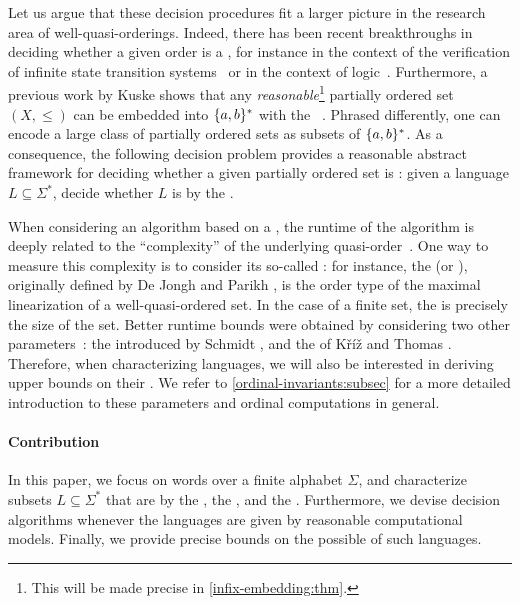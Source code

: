 \AP Let us argue that these decision procedures fit a larger picture in the
research area of well-quasi-orderings.
Indeed, there has been recent breakthroughs in deciding whether a given order
is a , for instance in the context of the verification of
infinite state transition systems~\cite{DBLP:conf/fsttcs/FinkelG19} or in the
context of logic~\cite{DBLP:journals/pacmpl/BergstrasserGLZ24}.
Furthermore, a previous work by Kuske shows that any
\emph{reasonable}\footnote{ This will be made precise in
\cref{infix-embedding:thm}. } partially ordered set $(X, \leq)$ can
be embedded into $\{ a,b \}^*$ with the ~\cite[Lemma
5.1]{DBLP:journals/ita/Kuske06}. Phrased differently, one can encode a large
class of partially ordered sets as subsets of $\{ a,b \}^*$. As a consequence,
the following decision problem provides a reasonable abstract framework for
deciding whether a given partially ordered set is :
given a language $L \subseteq \Sigma^*$, decide whether $L$ is
 by the .

\AP When considering an algorithm based on a , the
runtime of the algorithm is deeply related to the ``complexity'' of the
underlying quasi-order~\cite{SCHMITZ17}. One way to measure this complexity is
to consider its so-called : for instance, the
 (or ), originally defined by De Jongh and Parikh
\cite{dejongh77}, is the order type of the maximal linearization of a
well-quasi-ordered set. In the case of a finite set, the  is precisely
the size of the set. Better runtime bounds were obtained by considering two
other parameters~\cite{SCHMITZ19}: the  introduced by
Schmidt \cite{schmidt81}, and the  of Kříž and Thomas
\cite{kriz90b}. Therefore, when characterizing 
languages, we will also be interested in deriving upper bounds on their
. We refer to \cref{ordinal-invariants:subsec} for a
more detailed introduction to these parameters and ordinal computations in
general.

\paragraph*{Contribution} In this paper, we focus on words over a finite
alphabet $\Sigma$, and characterize subsets $L \subseteq \Sigma^*$ that are
 by the , the ,
and the . Furthermore, we devise decision algorithms
whenever the languages are given by reasonable computational models. Finally,
we provide precise bounds on the possible  of such
languages.

